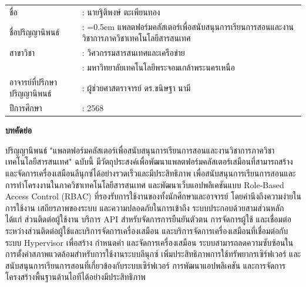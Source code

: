 {}
\begin{tabularx}{\textwidth}{lX}
ชื่อ                           & : นายฐิติพงษ์ ตะเพียนทอง         %
\\
ชื่อปริญญานิพนธ์                  & : \hangindent=0.5em          %
                                แพลตฟอร์มคลัสเตอร์เพื่อสนับสนุนการเรียนการสอนและงานวิชาการภาควิชาเทคโนโลยีสารสนเทศ  %
\\
สาขาวิชา                       & : วิศวกรรมสารสนเทศและเครือข่าย %
\\
                             & : มหาวิทยาลัยเทคโนโลยีพระจอมเกล้าพระนครเหนือ
\\
อาจารย์ที่ปรึกษาปริญญานิพนธ์        & : ผู้ช่วยศาสตราจารย์ ดร.ขนิษฐา นามี    %
\\
ปีการศึกษา                     & : 2568     %
\end{tabularx}

\vspace{5mm}
\begin{center}\textbf{บทคัดย่อ}\end{center}
\hspace*{1.5em} %
ปริญญานิพนธ์ "แพลตฟอร์มคลัสเตอร์เพื่อสนับสนุนการเรียนการสอนและงานวิชาการภาควิชาเทคโนโลยีสารสนเทศ" ฉบับนี้ มีวัตถุประสงค์เพื่อพัฒนาแพลตฟอร์มคลัสเตอร์เสมือนที่สามารถสร้างและจัดการเครื่องเสมือนลีนุกซ์ได้อย่างรวดเร็วและมีประสิทธิภาพ เพื่อสนับสนุนการเรียนการสอนและการทำโครงงานในภาควิชาเทคโนโลยีสารสนเทศ และพัฒนาเว็บแอปพลิเคชันแบบ Role-Based Access Control (RBAC) ที่รองรับการใช้งานของทั้งนักศึกษาและอาจารย์ โดยคำนึงถึงความง่ายในการใช้งาน เสถียรภาพของระบบ และความปลอดภัยในการเข้าถึง ระบบประกอบด้วยสามส่วนหลัก ได้แก่ ส่วนติดต่อผู้ใช้งาน บริการ API สำหรับจัดการการยืนยันตัวตน การจัดการผู้ใช้ และเชื่อมต่อระหว่างส่วนติดต่อผู้ใช้และบริการจัดการเครื่องเสมือน และบริการจัดการเครื่องเสมือนที่เชื่อมต่อกับระบบ Hypervisor เพื่อสร้าง กำหนดค่า และจัดการเครื่องเสมือน ระบบสามารถลดความซับซ้อนในการตั้งค่าสภาพแวดล้อมสำหรับการใช้งานระบบลีนุกซ์ เพิ่มประสิทธิภาพการใช้ทรัพยากรเซิร์ฟเวอร์ และสนับสนุนการเรียนการสอนที่เกี่ยวข้องกับระบบเซิร์ฟเวอร์ การพัฒนาแอปพลิเคชัน และการจัดการโครงสร้างพื้นฐานด้านไอทีได้อย่างมีประสิทธิภาพ

